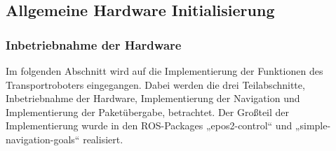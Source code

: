 \subsection{Allgemeine Hardware Initialisierung}

\subsubsection{Inbetriebnahme der Hardware}

Im folgenden Abschnitt wird auf die Implementierung der Funktionen des Transportroboters eingegangen. Dabei werden die drei Teilabschnitte, Inbetriebnahme der Hardware, Implementierung der Navigation und Implementierung der Paketübergabe, betrachtet. Der Großteil der Implementierung wurde in den ROS-Packages „epos2-control“ und „simple-navigation-goals“ realisiert.